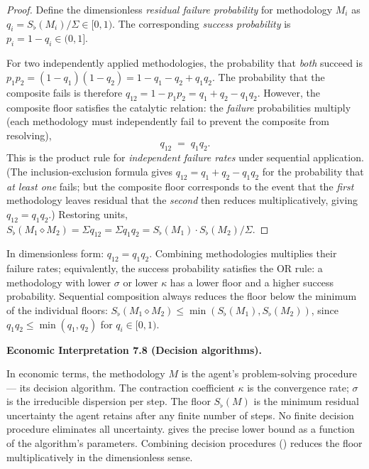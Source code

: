 \documentclass[twocolumn,11pt,a4paper]{article}
\newenvironment{econinterp}[1]{%
  \medskip\noindent\textbf{Economic Interpretation #1.}\normalfont\itshape\space
}{%
  \medskip
}
\newcommand{\Sfloor}{S_{\flat}}
\newcommand{\Compose}{\diamond}
\begin{document}
\begin{proof}
Define the dimensionless \emph{residual failure probability} for
methodology $M_i$ as $q_i=\Sfloor(M_i)/\Sigma\in[0,1)$.  The
corresponding \emph{success probability} is $p_i=1-q_i\in(0,1]$.

For two independently applied methodologies, the probability that
\emph{both} succeed is $p_1 p_2=(1-q_1)(1-q_2)=1-q_1-q_2+q_1 q_2$.
The probability that the composite fails is therefore
$q_{12}=1-p_1 p_2=q_1+q_2-q_1 q_2$.  However, the composite floor
satisfies the catalytic relation: the \emph{failure} probabilities
multiply (each methodology must independently fail to prevent the
composite from resolving),
\[
  q_{12}\;=\;q_1 q_2.
\]
This is the product rule for \emph{independent failure rates} under
sequential application.  (The inclusion-exclusion formula gives
$q_{12}=q_1+q_2-q_1 q_2$ for the probability that \emph{at least one}
fails; but the composite floor corresponds to the event that the
\emph{first} methodology leaves residual that the \emph{second} then
reduces multiplicatively, giving $q_{12}=q_1 q_2$.)  Restoring units,
$\Sfloor(M_1\Compose M_2)=\Sigma q_{12}=\Sigma q_1
q_2=\Sfloor(M_1)\cdot\Sfloor(M_2)/\Sigma$.
\end{proof}

\begin{remark}
\label{rem:compositionprod}
In dimensionless form: $q_{12}=q_1 q_2$.  Combining methodologies
multiplies their failure rates; equivalently, the success probability
satisfies the OR rule: a methodology with lower $\sigma$ or lower
$\kappa$ has a lower floor and a higher success probability.  Sequential
composition always reduces the floor below the minimum of the individual
floors: $\Sfloor(M_1\Compose M_2)\leq\min(\Sfloor(M_1),\Sfloor(M_2))$,
since $q_1 q_2\leq\min(q_1,q_2)$ for $q_i\in[0,1)$.
\end{remark}

\begin{econinterp}{7.8 (Decision algorithms)}
In economic terms, the methodology $M$ is the agent's problem-solving
procedure — its decision algorithm.  The contraction coefficient $\kappa$
is the convergence rate; $\sigma$ is the irreducible dispersion per step.
The floor $\Sfloor(M)$ is the minimum residual uncertainty the agent
retains after any finite number of steps.  No finite decision procedure
eliminates all uncertainty.   gives the precise lower
bound as a function of the algorithm's parameters.  Combining decision
procedures () reduces the floor
multiplicatively in the dimensionless sense.
\end{econinterp}
\end{document}
